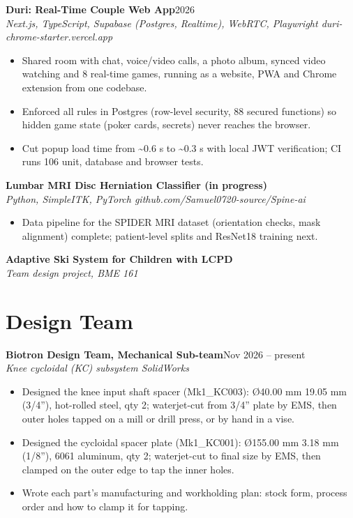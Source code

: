 \documentclass[10pt,letterpaper]{article}
\newcommand{\entry}[3]{\needspace{4\baselineskip}\textbf{#1}\hfill #2\\{\small\itshape #3}\par}
\begin{document}
\entry{Duri: Real-Time Couple Web App}{2026}{Next.js, TypeScript, Supabase (Postgres, Realtime), WebRTC, Playwright \textbar{} duri-chrome-starter.vercel.app}
\begin{itemize}
  \item Shared room with chat, voice/video calls, a photo album, synced video watching and 8 real-time games, running as a website, PWA and Chrome extension from one codebase.
  \item Enforced all rules in Postgres (row-level security, 88 secured functions) so hidden game state (poker cards, secrets) never reaches the browser.
  \item Cut popup load time from \textasciitilde 0.6 s to \textasciitilde 0.3 s with local JWT verification; CI runs 106 unit, database and browser tests.
\end{itemize}

\entry{Lumbar MRI Disc Herniation Classifier (in progress)}{}{Python, SimpleITK, PyTorch \textbar{} github.com/Samuel0720-source/Spine-ai}
\begin{itemize}
  \item Data pipeline for the SPIDER MRI dataset (orientation checks, mask alignment) complete; patient-level splits and ResNet18 training next.
\end{itemize}

\entry{Adaptive Ski System for Children with LCPD}{}{Team design project, BME 161}

\section{Design Team}
\entry{Biotron Design Team, Mechanical Sub-team}{Nov 2026 -- present}{Knee cycloidal (KC) subsystem \textbar{} SolidWorks}
\begin{itemize}
  \item Designed the knee input shaft spacer (Mk1\_KC003): \O 40.00 mm \texttimes{} 19.05 mm (3/4''), hot-rolled steel, qty 2; waterjet-cut from 3/4'' plate by EMS, then outer holes tapped on a mill or drill press, or by hand in a vise.
  \item Designed the cycloidal spacer plate (Mk1\_KC001): \O 155.00 mm \texttimes{} 3.18 mm (1/8''), 6061 aluminum, qty 2; waterjet-cut to final size by EMS, then clamped on the outer edge to tap the inner holes.
  \item Wrote each part's manufacturing and workholding plan: stock form, process order and how to clamp it for tapping.
\end{itemize}
\end{document}

